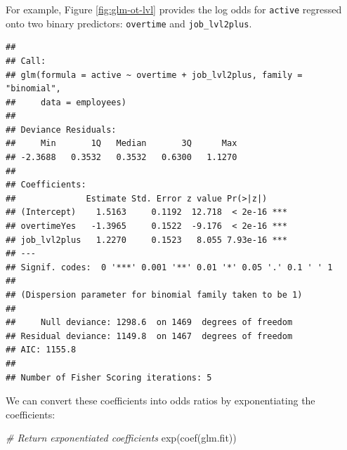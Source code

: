 \documentclass[
]{book}
\newenvironment{Shaded}{\begin{snugshade}}{\end{snugshade}}
\newcommand{\AttributeTok}[1]{\textcolor[rgb]{0.77,0.63,0.00}{#1}}
\newcommand{\CommentTok}[1]{\textcolor[rgb]{0.56,0.35,0.01}{\textit{#1}}}
\newcommand{\DecValTok}[1]{\textcolor[rgb]{0.00,0.00,0.81}{#1}}
\newcommand{\FunctionTok}[1]{\textcolor[rgb]{0.00,0.00,0.00}{#1}}
\newcommand{\NormalTok}[1]{#1}
\newcommand{\OtherTok}[1]{\textcolor[rgb]{0.56,0.35,0.01}{#1}}
\newcommand{\SpecialCharTok}[1]{\textcolor[rgb]{0.00,0.00,0.00}{#1}}
\newcommand{\StringTok}[1]{\textcolor[rgb]{0.31,0.60,0.02}{#1}}
\begin{document}
For example, Figure \ref{fig:glm-ot-lvl} provides the log odds for \texttt{active} regressed onto two binary predictors: \texttt{overtime} and \texttt{job\_lvl2plus}.

\begin{Shaded}
\end{Shaded}

\begin{verbatim}
## 
## Call:
## glm(formula = active ~ overtime + job_lvl2plus, family = "binomial", 
##     data = employees)
## 
## Deviance Residuals: 
##     Min       1Q   Median       3Q      Max  
## -2.3688   0.3532   0.3532   0.6300   1.1270  
## 
## Coefficients:
##              Estimate Std. Error z value Pr(>|z|)    
## (Intercept)    1.5163     0.1192  12.718  < 2e-16 ***
## overtimeYes   -1.3965     0.1522  -9.176  < 2e-16 ***
## job_lvl2plus   1.2270     0.1523   8.055 7.93e-16 ***
## ---
## Signif. codes:  0 '***' 0.001 '**' 0.01 '*' 0.05 '.' 0.1 ' ' 1
## 
## (Dispersion parameter for binomial family taken to be 1)
## 
##     Null deviance: 1298.6  on 1469  degrees of freedom
## Residual deviance: 1149.8  on 1467  degrees of freedom
## AIC: 1155.8
## 
## Number of Fisher Scoring iterations: 5
\end{verbatim}

We can convert these coefficients into odds ratios by exponentiating the coefficients:

\begin{Shaded}
\begin{Highlighting}[]
\CommentTok{\# Return exponentiated coefficients}
\FunctionTok{exp}\NormalTok{(}\FunctionTok{coef}\NormalTok{(glm.fit))}
\end{Highlighting}
\end{Shaded}
\end{document}
